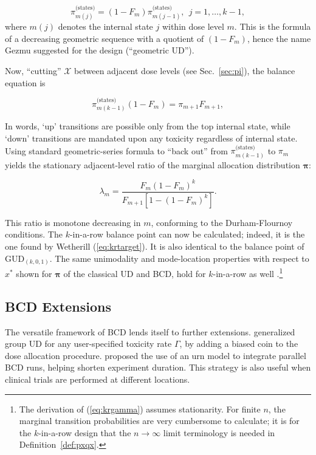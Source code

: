 \begin{equation}\label{eq:kinternal}
\pi^{\textrm{(states)}}_{m(j)}=\left(1-F_m\right)\pi^{\textrm{(states)}}_{m(j-1)},\ \ j=1,\ldots,k-1,
\end{equation}
\noindent where $m(j)$ denotes the internal state $j$ within dose level $m$. This is the formula of a decreasing geometric sequence with a quotient of $\left(1-F_m\right)$, hence the name Gezmu suggested for the design (``geometric UD'').

Now, ``cutting'' $\mathcal{X}$ between adjacent dose levels (see Sec.~\ref{sec:pi}), the balance equation is

\begin{equation}\label{eq:kexternal}
\pi^{\textrm{(states)}}_{m(k-1)}\left(1-F_m\right)=\pi_{m+1}F_{m+1},
\end{equation}

\noindent In words, `up' transitions are possible only from the top internal state, while `down' transitions are mandated upon any toxicity regardless of internal state. Using standard geometric-series formula to ``back out'' from $\pi^{\textrm{(states)}}_{m(k-1)}$ to $\pi_m$ yields the stationary adjacent-level ratio of the marginal allocation distribution $\boldsymbol{\pi}$:

\begin{equation}\label{eq:krgamma}
\lambda_m=\frac{F_m\left(1-F_m\right)^{k}}{F_{m+1}\left[1-\left(1-F_m\right)^{k}\right]}.
\end{equation}

This ratio is monotone decreasing in $m$, conforming to the Durham-Flournoy conditions. The $k$-in-a-row balance point can now be calculated; indeed, it is the one found by Wetherill (\ref{eq:krtarget}). It is also identical to the balance point of GUD$_{(k,0,1)}$. The same unimodality and mode-location properties with respect to $x^*$ shown for $\boldsymbol{\pi}$ of the classical UD and BCD, hold for $k$-in-a-row as well \citep{Oron:Hoff:thek:2009}.\footnote{The derivation of (\ref{eq:krgamma}) assumes stationarity. For finite $n$, the marginal transition probabilities are very cumbersome to calculate; it is for the $k$-in-a-row design that the $n\to\infty$ limit terminology is needed in Definition~\ref{def:pxqx}.}

\subsection{BCD Extensions}

The versatile framework of BCD lends itself to further extensions. \cite{Bald:Bort:Giov:2008} generalized group UD for any user-specified toxicity rate $\Gamma$, by adding a biased coin to the dose allocation procedure. \cite{Flou:aran:1998} proposed the use of an urn model to integrate parallel BCD runs, helping shorten experiment duration. This strategy is also useful when clinical trials are performed at different locations.

